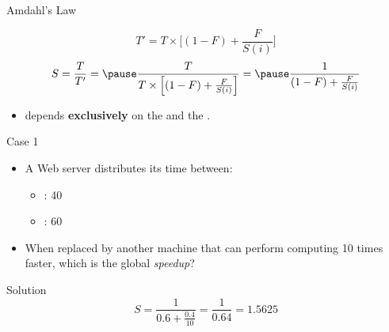 \begin{frame}[t]{Amdahl's Law}
\begin{small}
\begin{displaymath}
T'=T \times \Big[ (1 - F) + \frac{F}{S(i)} \Big]
\end{displaymath}
\pause
\begin{displaymath}
S=\frac{T}{T'}=\pause
\frac{T}{T \times \Big[ (1 - F) + \frac{F}{S(i)} \Big]} =\pause
\frac{1}{(1 - F) + \frac{F}{S(i)}}
\end{displaymath}
\end{small}
\begin{itemize}
  \item {} depends \textbf{exclusively} on
        the  and the .
\end{itemize}
\end{frame}

\begin{frame}[t]{Case 1}
\begin{itemize}
  \item A Web server distributes its time between: 
    \begin{itemize}
      \item {}: 40%
      \item {}: 60%
    \end{itemize}
  \item When replaced by another machine that can perform
        computing 10 times faster, which is the global \emph{speedup}?
\end{itemize}
\begin{block}{Solution}
\begin{displaymath}
S=
\frac{1}{0.6+\frac{0.4}{10}} =
\frac{1}{0.64} =
1.5625
\end{displaymath}
\end{block}
\end{frame}

